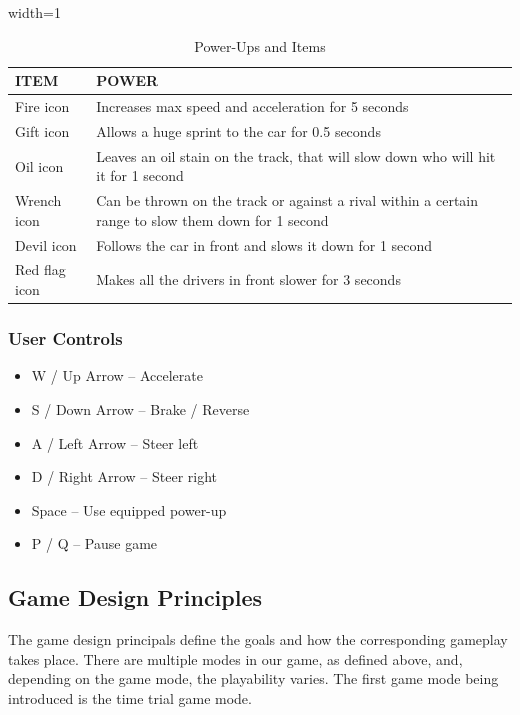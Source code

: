 \documentclass[12pt]{article}
\begin{document}
\begin{table}[H]
\centering
\begin{adjustbox}{width=1\textwidth}
\begin{tabular}{|l|p{}|}
\hline
\textbf{ITEM} & \textbf{POWER} \\
\hline
Fire icon & Increases max speed and acceleration for 5 seconds \\
\hline
Gift icon & Allows a huge sprint to the car for 0.5 seconds \\
\hline
Oil icon & Leaves an oil stain on the track, that will slow down who will hit it for 1 second \\
\hline
Wrench icon & Can be thrown on the track or against a rival within a certain range to slow them down for 1 second \\
\hline
Devil icon & Follows the car in front and slows it down for 1 second \\
\hline
Red flag icon & Makes all the drivers in front slower for 3 seconds \\
\hline
\end{tabular}
\end{adjustbox}
\caption{Power-Ups and Items}
\end{table}

\subsubsection{User Controls}

\begin{itemize}
\item W / Up Arrow -- Accelerate
\item S / Down Arrow -- Brake / Reverse
\item A / Left Arrow -- Steer left
\item D / Right Arrow -- Steer right
\item Space -- Use equipped power-up
\item P / Q -- Pause game
\end{itemize}

\subsection{Game Design Principles}

The game design principals define the goals and how the corresponding gameplay takes place. There are multiple modes in our game, as defined above, and, depending on the game mode, the playability varies. The first game mode being introduced is the time trial game mode.
\end{document}
